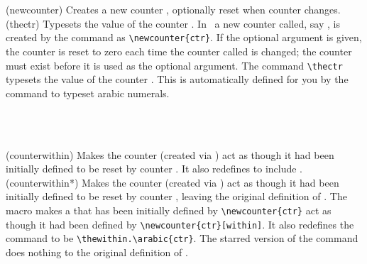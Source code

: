 \begin{syntax}
\cmd{\newcounter} \\
\cmd{\thectr} \\
\end{syntax}
\glossary(newcounter)%
  {}%
  {Creates a new counter , optionally reset when counter 
   changes.}
\glossary(thectr)%
  {}%
  {Typesets the value of the counter .}
    In \ltx\ a new counter called, say , is created by the 
\cmd{\newcounter} command as \verb?\newcounter{ctr}?. 
If the optional 
argument is given, the counter  is reset to zero each time the 
counter called  is changed; the  counter 
must exist before it is used as the optional argument. The command 
\verb?\thectr? typesets the value
of the counter . This is automatically defined for you by the 
\cmd{\newcounter} command to typeset arabic numerals.

\begin{syntax}
\cmd{\counterwithin} \\
\cmd{\counterwithin*} \\
\end{syntax}
\glossary(counterwithin)%
  {}%
  {Makes the counter  (created via ) act as though 
   it had been initially defined to be reset by counter .
   It also redefines  to include .}
\glossary(counterwithin*)%
  {}%
  {Makes the counter  (created via ) act as though 
   it had been initially defined to be reset by counter , leaving
   the original definition of .}
The \cmd{\counterwithin} macro makes a  that has been initially
defined by \verb?\newcounter{ctr}? act as though it had been defined by
\verb?\newcounter{ctr}[within]?. It also redefines the  command
to be \verb?\thewithin.\arabic{ctr}?. The starred version of the command
does nothing to the original definition of .

